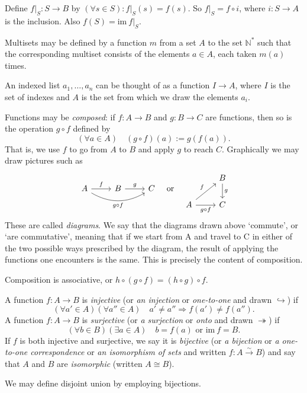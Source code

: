 Define $f|_{S}:S\rightarrow B$ by $(\forall s\in S):f|_{S}(s)=f(s)$. So $f|_S=f\circ i$, where $i:S\rightarrow A$ is the inclusion. Also $f(S)=\mathrm{im}\ f|_S$.

Multisets may be defined by a function $m$ from a set $A$ to the set $\mathbb{N}^*$ such that the corresponding multiset consists of the elements $a\in A$, each taken $m(a)$ times.


An indexed list $a_1,\dots,a_n$ can be thought of as a function $I\rightarrow A$, where $I$ is the set of indexes and $A$ is the set from which we draw the elements $a_i$.


Functions may be \textit{composed}: if $f:A\rightarrow B$ and $g:B\rightarrow C$ are functions, then so is the operation $g\circ f$ defined by
\[
  (\forall a\in A)\quad (g\circ f)(a):=g(f(a)).
\]
That is, we use $f$ to go from $A$ to $B$ and apply $g$ to reach $C$. Graphically we may draw pictures such as
\[
  \begin{tikzcd}
    A \arrow[r, "f"] \arrow[rr, bend right=30, "g \circ f"'] & B \arrow[r, "g"] & C
  \end{tikzcd}
  \quad \text{or} \quad
  \begin{tikzcd}
    & B \arrow[d, "g"] \\
    A \arrow[ur, "f"] \arrow[r, "g \circ f"'] & C
  \end{tikzcd}
\]
These are called \textit{diagrams}. We say that the diagrams drawn above ‘commute’, or ‘are commutative’, meaning that if we start from A and travel to C in either of the two possible ways prescribed by the diagram, the result of applying the functions one encounters is the same. This is precisely the content of composition.

Composition is associative, or $h\circ(g\circ f)=(h\circ g)\circ f$.

A function $f:A\rightarrow B$ is \textit{injective} (or \textit{an injection} or \textit{one-to-one} and drawn $\hookrightarrow$) if
\[
  (\forall a'\in A)(\forall a''\in A)\quad a'\neq a''\Rightarrow f(a')\neq f(a'').
\]
A function $f:A\rightarrow B$ is \textit{surjective} (or \textit{a surjection} or \textit{onto} and drawn $\twoheadrightarrow$) if
\[
  (\forall b\in B)(\exists a\in A)\quad b=f(a)\text{ or }\mathrm{im}\ f = B.
\]
If $f$ is both injective and surjective, we say it is \textit{bijective} (or \textit{a bijection} or \textit{a one-to-one correspondence} or \textit{an isomorphism of sets} and written $f:A\xrightarrow{\sim}B$) and say that $A$ and $B$ are \textit{isomorphic} (written $A\cong B$).

We may define disjoint union by employing bijections.

